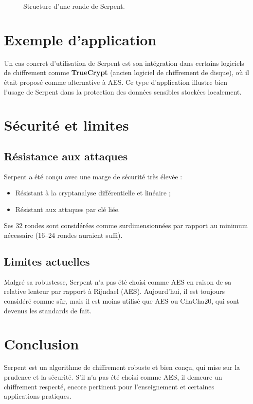 \documentclass[12pt,a4paper]{report}
\begin{document}
\begin{figure}[h]
    \centering
    \caption{Structure d’une ronde de Serpent.}
\end{figure}

\chapter*{Exemple d’application}

Un cas concret d’utilisation de Serpent est son intégration dans certains logiciels de chiffrement comme \textbf{TrueCrypt} (ancien logiciel de chiffrement de disque), où il était proposé comme alternative à AES.  
Ce type d’application illustre bien l’usage de Serpent dans la protection des données sensibles stockées localement.

\chapter*{Sécurité et limites}

\setcounter{section}{0}

\section{Résistance aux attaques}
Serpent a été conçu avec une marge de sécurité très élevée :
\begin{itemize}
    \item Résistant à la cryptanalyse différentielle et linéaire ;
    \item Résistant aux attaques par clé liée.
\end{itemize}
Ses 32 rondes sont considérées comme surdimensionnées par rapport au minimum nécessaire (16–24 rondes auraient suffi).

\section{Limites actuelles}

Malgré sa robustesse, Serpent n’a pas été choisi comme AES en raison de sa relative lenteur par rapport à Rijndael (AES).  
Aujourd’hui, il est toujours considéré comme sûr, mais il est moins utilisé que AES ou ChaCha20, qui sont devenus les standards de fait.

\chapter*{Conclusion}

Serpent est un algorithme de chiffrement robuste et bien conçu, qui mise sur la prudence et la sécurité.  
S’il n’a pas été choisi comme AES, il demeure un chiffrement respecté, encore pertinent pour l’enseignement et certaines applications pratiques.
\end{document}
